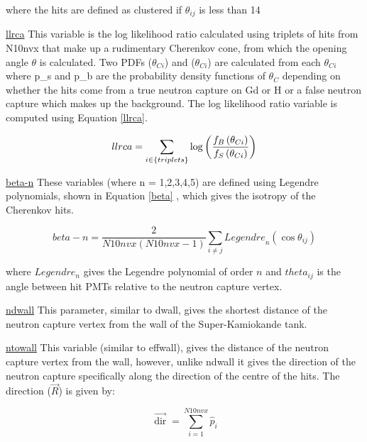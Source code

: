 where the hits are defined as clustered if $\theta_{ij}$ is less than 14


\underline{llrca}
\newline
This variable is the log likelihood ratio calculated using triplets of hits from N10nvx that make up a rudimentary Cherenkov cone, from which the opening angle $\theta$ is calculated. Two PDFs ($\theta_{Ci}$) and ($\theta_{Ci}$) are calculated from each $\theta_{Ci}$ where p\_s and p\_b are the probability density functions of $\theta_{C}$ depending on whether the hits come from a true neutron capture on Gd or H or a false neutron capture which makes up the background. The log likelihood ratio variable is computed using Equation {\ref{llrca}}.

\begin{equation}
\label{llrca}
\newline
  llrca =\sum_{i \in\{ { triplets }\}} \log \left(\frac{f_{B}\left(\theta_{C i}\right)}{f_{S}\left(\theta_{C i}\right)}\right)
\end{equation}


\underline{beta-n}
\newline
These variables (where n = 1,2,3,4,5) are defined using Legendre polynomials, shown in Equation \ref{beta} \cite{snopaper}, which gives the isotropy of the Cherenkov hits.

\begin{equation}
\label{beta}
 beta- n=\frac{2}{N 10 {nvx}(N 10 {nvx}-1)} \sum_{i \neq j}  { Legendre }_{n}\left(\cos \theta_{i j}\right)
\end{equation}

where $Legendre_n$ gives the Legendre polynomial of order $n$ and $theta_{ij}$ is the angle between hit PMTs relative to the neutron capture vertex.



\underline{ndwall}
\newline
This parameter, similar to dwall, gives the shortest distance of the neutron capture vertex from the wall of the Super-Kamiokande tank.
\newline



\underline{ntowall}
\newline
This variable (similar to effwall), gives the distance of the neutron capture vertex from the wall, however, unlike ndwall it gives the direction of the neutron capture specifically along the direction of the centre of the hits. The direction ($\overrightarrow{R}$) is given by:

\begin{equation}
\overrightarrow{\operatorname{dir}}=\sum_{i=1}^{N 10 n v x} \hat{p}_{i}
\end{equation}





